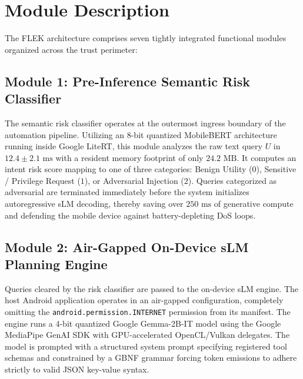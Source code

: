 \section{Module Description}

The FLEK architecture comprises seven tightly integrated functional modules organized across the trust perimeter:

\subsection{Module 1: Pre-Inference Semantic Risk Classifier}
The semantic risk classifier operates at the outermost ingress boundary of the automation pipeline. Utilizing an 8-bit quantized MobileBERT architecture running inside Google LiteRT, this module analyzes the raw text query $U$ in $12.4 \pm 2.1\text{ ms}$ with a resident memory footprint of only $24.2\text{ MB}$. It computes an intent risk score mapping to one of three categories: Benign Utility ($0$), Sensitive / Privilege Request ($1$), or Adversarial Injection ($2$). Queries categorized as adversarial are terminated immediately before the system initializes autoregressive sLM decoding, thereby saving over $250\text{ ms}$ of generative compute and defending the mobile device against battery-depleting DoS loops.

\subsection{Module 2: Air-Gapped On-Device sLM Planning Engine}
Queries cleared by the risk classifier are passed to the on-device sLM engine. The host Android application operates in an air-gapped configuration, completely omitting the \texttt{android.permission.INTERNET} permission from its manifest. The engine runs a 4-bit quantized Google Gemma-2B-IT model using the Google MediaPipe GenAI SDK with GPU-accelerated OpenCL/Vulkan delegates. The model is prompted with a structured system prompt specifying registered tool schemas and constrained by a GBNF grammar forcing token emissions to adhere strictly to valid JSON key-value syntax.

